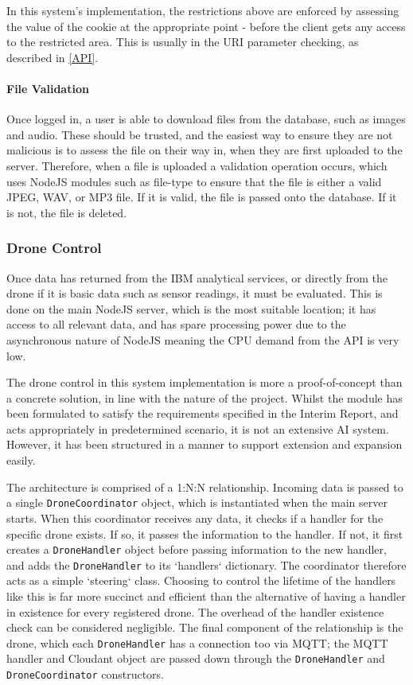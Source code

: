 \documentclass{article}
\begin{document}
In this system's implementation, the restrictions above are enforced by assessing the value of the cookie at the appropriate point - before the client gets any access to the restricted area. This is usually in the URI parameter checking, as described in \ref{API}. 

\paragraph{File Validation}
Once logged in, a user is able to download files from the database, such as images and audio. These should be trusted, and the easiest way to ensure they are not malicious is to assess the file on their way in, when they are first uploaded to the server. Therefore, when a file is uploaded a validation operation occurs, which uses NodeJS modules such as file-type \cite{file-type} to ensure that the file is either a valid JPEG, WAV, or MP3 file. If it is valid, the file is passed onto the database. If it is not, the file is deleted. 


\subsubsection{Drone Control} \label{DroneControl}
Once data has returned from the IBM analytical services, or directly from the drone if it is basic data such as sensor readings, it must be evaluated. This is done on the main NodeJS server, which is the most suitable location; it has access to all relevant data, and has spare processing power due to the asynchronous nature of NodeJS meaning the CPU demand from the API is very low. 

The drone control in this system implementation is more a proof-of-concept than a concrete solution, in line with the nature of the project. Whilst the module has been formulated to satisfy the requirements specified in the Interim Report, and acts appropriately in predetermined scenario, it is not an extensive AI system. However, it has been structured in a manner to support extension and expansion easily. 

The architecture is comprised of a 1:N:N relationship. Incoming data is passed to a single \texttt{DroneCoordinator} object, which is instantiated when the main server starts. When this coordinator receives any data, it checks if a handler for the specific drone exists. If so, it passes the information to the handler. If not, it first creates a \texttt{DroneHandler} object before passing information to the new handler, and adds the \texttt{DroneHandler} to its `handlers` dictionary. The coordinator therefore acts as a simple `steering` class. Choosing to control the lifetime of the handlers like this is far more succinct and efficient than the alternative of having a handler in existence for every registered drone. The overhead of the handler existence check can be considered negligible. The final component of the relationship is the drone, which each \texttt{DroneHandler} has a connection too via MQTT; the MQTT handler and Cloudant object are passed down through the \texttt{DroneHandler} and \texttt{DroneCoordinator} constructors. 
\end{document}
